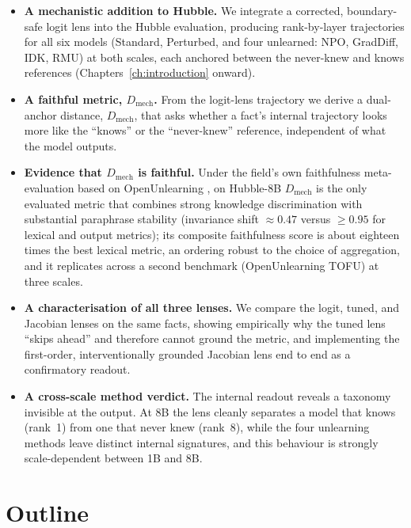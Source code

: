 \begin{itemize}
  \item \textbf{A mechanistic addition to Hubble.} We integrate a corrected, boundary-safe logit lens into
  the Hubble evaluation, producing rank-by-layer trajectories for all six models (Standard, Perturbed, and
  four unlearned: NPO, GradDiff, IDK, RMU) at both scales, each anchored between the never-knew and knows
  references (Chapters~\ref{ch:introduction} onward).
  \item \textbf{A faithful metric, \(D_\text{mech}\).} From the logit-lens trajectory we derive a
  dual-anchor distance, \(D_\text{mech}\), that asks whether a fact's internal trajectory looks more like
  the ``knows'' or the ``never-knew'' reference, independent of what the model outputs.
  \item \textbf{Evidence that \(D_\text{mech}\) is faithful.} Under the field's own faithfulness
  meta-evaluation based on OpenUnlearning \citep{dorna2025openunlearning}, on Hubble-8B \(D_\text{mech}\) is
  the only evaluated metric that combines strong knowledge discrimination with substantial paraphrase
  stability (invariance shift \(\approx 0.47\) versus \(\geq 0.95\) for lexical and output metrics); its
  composite faithfulness score is about eighteen times the best lexical metric, an ordering robust to the
  choice of aggregation, and it replicates across a second benchmark (OpenUnlearning TOFU) at three scales.
  \item \textbf{A characterisation of all three lenses.} We compare the logit, tuned, and Jacobian lenses on
  the same facts, showing empirically why the tuned lens ``skips ahead'' and therefore cannot ground the
  metric, and implementing the first-order, interventionally grounded Jacobian lens end to end as a
  confirmatory readout.
  \item \textbf{A cross-scale method verdict.} The internal readout reveals a taxonomy invisible at the
  output. At 8B the lens cleanly separates a model that knows (rank~1) from one that never knew (rank~8),
  while the four unlearning methods leave distinct internal signatures, and this behaviour is strongly
  scale-dependent between 1B and 8B.
\end{itemize}

\section{Outline}
\label{sec:outline}

